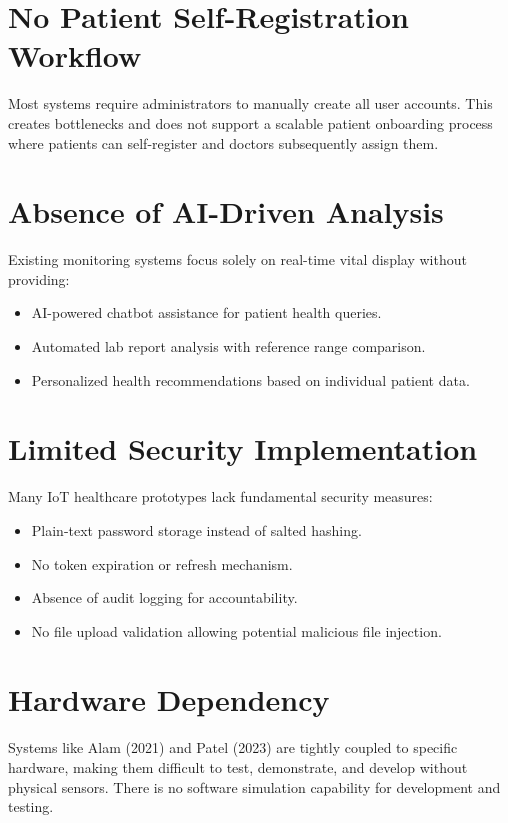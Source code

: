 \section{No Patient Self-Registration Workflow}
Most systems require administrators to manually create all user accounts. This creates bottlenecks and does not support a scalable patient onboarding process where patients can self-register and doctors subsequently assign them.

\section{Absence of AI-Driven Analysis}
Existing monitoring systems focus solely on real-time vital display without providing:
\begin{itemize}[leftmargin=*]
    \item AI-powered chatbot assistance for patient health queries.
    \item Automated lab report analysis with reference range comparison.
    \item Personalized health recommendations based on individual patient data.
\end{itemize}

\section{Limited Security Implementation}
Many IoT healthcare prototypes lack fundamental security measures:
\begin{itemize}[leftmargin=*]
    \item Plain-text password storage instead of salted hashing.
    \item No token expiration or refresh mechanism.
    \item Absence of audit logging for accountability.
    \item No file upload validation allowing potential malicious file injection.
\end{itemize}

\section{Hardware Dependency}
Systems like Alam (2021) and Patel (2023) are tightly coupled to specific hardware, making them difficult to test, demonstrate, and develop without physical sensors. There is no software simulation capability for development and testing.

